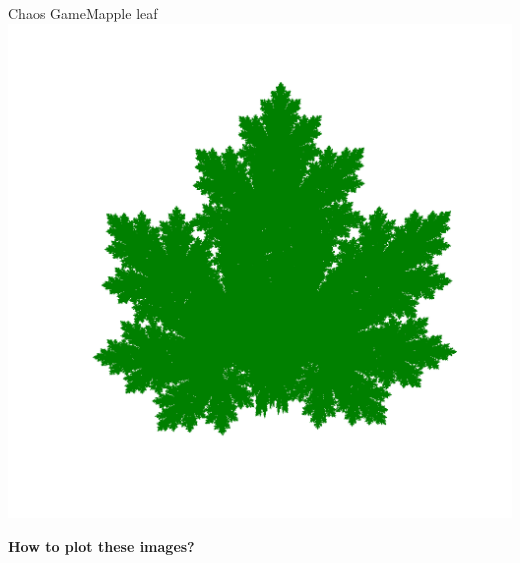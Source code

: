 \documentclass[usenames,dvipsnames,svgnames,10pt,aspectratio=169]{beamer}
\begin{document}
\begin{frame}[t, c]{Chaos Game}{Mapple leaf}
	\centering
	\includegraphics[height=.8\textheight]{Mapple_leaf_6}
	\vspace{1cm}
\end{frame}




\begin{frame}[t, c]{}
	\centering
	\vspace{1cm}

	{\Large \textbf{How to plot these images?}}

	\bigskip

	{}

\end{frame}
\end{document}
